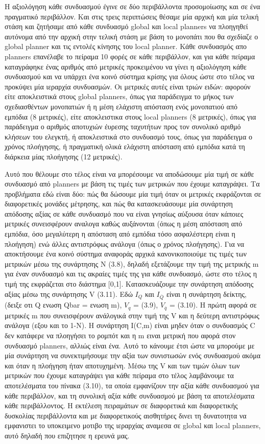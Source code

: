 \documentclass[a4paper,10pt]{article}
\begin{document}
Η αξιολόγηση κάθε συνδυασμού έγινε σε δύο περιβάλλοντα προσομοίωσης και σε ένα
πραγματικό περιβάλλον. Και στις τρεις περιπτώσεις θέσαμε μία αρχική και μία
τελική στάση και ζητήσαμε από κάθε συνδυασμό global και local planners να
πλοηγηθεί αυτόνομα από την αρχική στην τελική στάση με βάση το μονοπάτι που θα
σχεδίαζε ο global planner και τις εντολές κίνησης του local planner. Κάθε
συνδυασμός απο planners επανέλαβε το πείραμα 10 φορές σε κάθε περιβάλλον, και
για κάθε πείραμα καταγράφηκε ένας αριθμός από μετρικές προκειμένου να γίνει η
αξιολόγηση κάθε συνδυασμού και να υπάρχει ένα κοινό σύστημα κρίσης για όλους
ώστε στο τέλος να προκύψει μία ιεραρχία συνδυασμών. Οι μετρικές αυτές είναι
τριών ειδών: αφορούν είτε αποκλειστικά στους global planners, όπως για
παράδειγμα το μήκος των σχεδιασθέντων μονοπατιών ή η μέση ελάχιστη απόσταση
ενός μονοπατιού από εμπόδια (8 μετρικές), είτε αποκλειστικα στους local
planners (8 μετρικές), όπως για παράδειγμα ο αριθμός αποτυχιών έυρεσης
ταχυτήτων προς τον συνολικό αριθμό κλήσεων του ελεγκτή, ή αποκλειστικά στο
συνδυασμό τους, όπως για παράδειγμα ο χρόνος πλοήγησης, ή πραγματική ολικά
ελάχιστη απόσταση από εμπόδια κατά τη διάρκεια μίας πλοήγησης (12 μετρικές).

Αυτό που θέλουμε στο τέλος είναι να μπορέσουμε να αποδώσουμε μία τιμή σε κάθε
συνδυασμό από planners με βάση τις τιμές των μετρικών που έχουμε καταγράψει. Τα
προβλήματα εδώ είναι δύο: πώς θα δώσουμε μία τιμή όταν οι μετρικές εκφράζονται
σε διαφορετικές μονάδες μέτρησης, και πώς θα κατασκευάσουμε μία συνάρτηση
απόδοσης αξίας σε κάθε συνδυασμό που να είναι γνησίως αύξουσα όταν κάποιες
μετρικές συνεισφέρουν αναλογα καθώς αυξάνονται (όπως η μέση απόσταση από
εμπόδια, όσο μεγαλύτερη η απόσταση από εμπόδια τόσο ασφαλέστερη είναι η
πλοήγηση) ενώ άλλες αντιστρόφως ανάλογα (όπως ο χρόνος πλοήγησης). Για να
αποκτήσουμε ένα κοινό σύστημα αναφοράς αρχικά κανονικοποιούμε τις τιμές των
μετρικών μέσω της συνάρτησης N (3.8), δηλαδή εξετάζουμε την τιμή της μετρικής m
για έναν συνδυασμό και τις ακραίες τιμές της για κάθε συνδυασμό, ώστε στο τέλος
η τιμή της εκφράζεται στο διάστημα [0,1]. Κατασκευάζουμε την συνάρτηση
απόδοσης αξίας μέσω της συνάρτησης V (3.11).  Εδώ $I_Q$ και $I_\overline{Q}$
είναι η συνάρτηση δείκτης, (δειξε οτι Q ενωση Qbar = ενωση m), $V_q$ = (3.9),
$V_\overline{q}$ = (3.10). H πρώτη αφορά σε μετρικές m που συνεισφέρουν
ανάλογικά στην τιμή της V και η δεύτερη αντιστρόφως ανάλογα (εξου και το 1-N).
Η συνάρτηση I(C,m) είναι μηδεν όταν ο συνδυασμός C δεν κατάφερε να πλοηγήσει το
ρομπότ και η m ειναι μετρική που αφορά στον συνδυασμό planners, αλλιώς είναι
ένα.  Αυτό το κάνουμε έτσι ώστε να μπορούμε με μία συνάρτηση να συνεκτιμήσουμε
την αξία των συνιστωσών ενός συνδυασμού ακόμα και όταν η πλοήγηση ήταν
αποτυχημένη. Μέσω της V και των τιμών όλων των μετρικών που έχουμε καταγράψει για
κάθε πείραμα στο τέλος λαμβάνουμε τα αποτελέσματα του πίνακα (3.10), τα οποία
εμφανίζουν την αξία κάθε συνδυασμού για κάθε περιβάλλον, και τη συνολική αξία
κάθε συνδυασμού με βάση τα αποτελέσματα κάθε περιβάλλοντος. Η εκτέλεση πειραμάτων
σε διαφορετικά και διαφορετικής δυσκολίας περιβάλλοντα και με διαφορετικούς
αισθητήρες δινει τη δυνατοτητα να εμφανιστει το υποκειμενο μοτιβο της ιεραρχίας
αναμεσα σε global και local planners, αυτό δηλαδή που επιζητησε η ερευνά μας.
\end{document}
